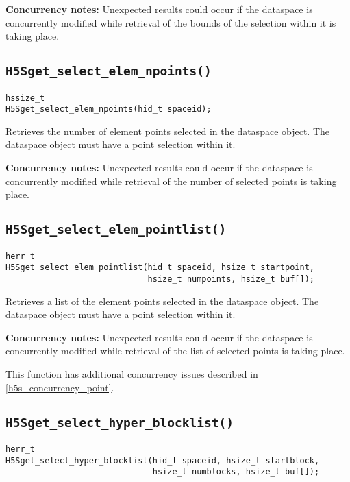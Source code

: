 \documentclass[../HDF5_RFC.tex]{subfiles}
\begin{document}
\textbf{Concurrency notes:} Unexpected results could occur if the dataspace is concurrently modified
while retrieval of the bounds of the selection within it is taking place.

\subsection{\texttt{H5Sget\_select\_elem\_npoints()}}
\label{apdx:h5s_func_h5sget_select_elem_npoints}

\begin{verbatim}
hssize_t
H5Sget_select_elem_npoints(hid_t spaceid);
\end{verbatim}

Retrieves the number of element points selected in the dataspace object. The dataspace object
must have a point selection within it.

\textbf{Concurrency notes:} Unexpected results could occur if the dataspace is concurrently modified
while retrieval of the number of selected points is taking place.

\subsection{\texttt{H5Sget\_select\_elem\_pointlist()}}
\label{apdx:h5s_func_h5sget_select_elem_pointlist}

\begin{verbatim}
herr_t
H5Sget_select_elem_pointlist(hid_t spaceid, hsize_t startpoint,
                             hsize_t numpoints, hsize_t buf[]);
\end{verbatim}

Retrieves a list of the element points selected in the dataspace object. The dataspace object
must have a point selection within it.

\textbf{Concurrency notes:} Unexpected results could occur if the dataspace is concurrently
modified while retrieval of the list of selected points is taking place.

This function has additional concurrency issues described in \ref{h5s_concurrency_point}.

\subsection{\texttt{H5Sget\_select\_hyper\_blocklist()}}
\label{apdx:h5s_func_h5sget_select_hyper_blocklist}

\begin{verbatim}
herr_t
H5Sget_select_hyper_blocklist(hid_t spaceid, hsize_t startblock,
                              hsize_t numblocks, hsize_t buf[]);
\end{verbatim}
\end{document}
